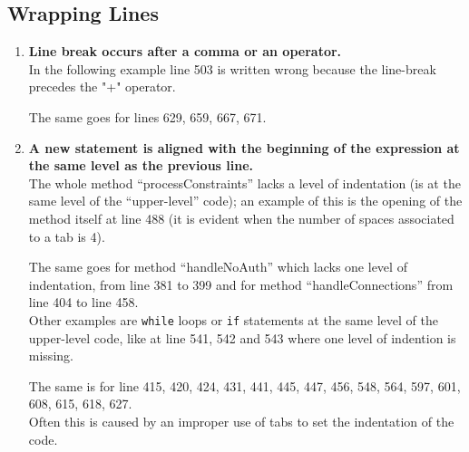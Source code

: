 \documentclass[a4paper,11pt]{report} %
\begin{document}
		\subsection*{Wrapping Lines}\begin{enumerate}[resume]
			\item \textbf{Line break occurs after a comma or an operator.}\smallskip \\
				In the following example line 503 is written wrong because the line-break precedes the "+" operator.
				
				The same goes for lines 629, 659, 667, 671.
			\setcounter{enumi}{16}
			\item \textbf{A new statement is aligned with the beginning of the expression at the same level as the previous line.}\smallskip \\
				The whole method ``processConstraints'' lacks a level of indentation (is at the same level of the ``upper-level'' code); an example of this is the opening of the method itself at line 488 (it is evident when the number of spaces associated to a tab is 4).
				
				The same goes for method ``handleNoAuth'' which lacks one level of indentation, from line 381 to 399 and for method ``handleConnections'' from line 404 to line 458.\\
				Other examples are \texttt{while} loops or \texttt{if} statements at the same level of the upper-level code, like at line 541, 542 and 543 where one level of indention is missing.
				
				The same is for line 415, 420, 424, 431, 441, 445, 447, 456, 548, 564, 597, 601, 608, 615, 618, 627.\\
				Often this is caused by an improper use of tabs to set the indentation of the code.
				

\end{enumerate}
\end{document}
